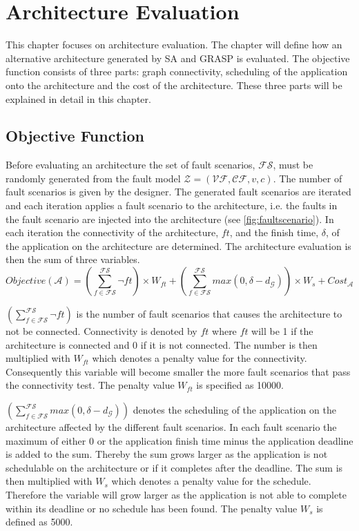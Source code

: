 \chapter{Architecture Evaluation}
\label{chap:arch-eval}
This chapter focuses on architecture evaluation. The chapter will define how an alternative architecture generated by SA and GRASP is evaluated. The objective function consists of three parts: graph connectivity, scheduling of the application onto the architecture and the cost of the architecture. These three parts will be explained in detail in this chapter.

\section{Objective Function}
Before evaluating an architecture the set of fault scenarios, $\mathcal{FS}$, must be randomly generated from the fault model $\mathcal{Z} = (\mathcal{VF}, \mathcal{CF}, v, c)$. The number of fault scenarios is given by the designer. The generated fault scenarios are iterated and each iteration applies a fault scenario to the architecture, i.e. the faults in the fault scenario are injected into the architecture (see \autoref{fig:faultscenario}). In each iteration the connectivity of the architecture, $ft$, and the finish time, $\delta$, of the application on the architecture are determined. The architecture evaluation is then the sum of three variables.
$$Objective(\mathcal{A}) = \left(\displaystyle\sum_{f \in \mathcal{FS}}^{\mathcal{FS}}{\neg ft}\right) \times W_{ft} + \left(\displaystyle\sum_{f \in \mathcal{FS}}^{\mathcal{FS}}{max(0, \delta - d_{\mathcal{G}})}\right) \times W_{s} + Cost_{\mathcal{A}}$$

$\left(\displaystyle\sum_{f \in \mathcal{FS}}^{\mathcal{FS}}{\neg ft}\right)$ is the number of fault scenarios that causes the architecture to not be connected. Connectivity is denoted by $ft$ where $ft$ will be 1 if the architecture is connected and 0 if it is not connected. The number is then multiplied with $W_{ft}$ which denotes a penalty value for the connectivity. Consequently this variable will become smaller the more fault scenarios that pass the connectivity test. The penalty value $W_{ft}$ is specified as 10000.

$\left(\displaystyle\sum_{f \in \mathcal{FS}}^{\mathcal{FS}}{max(0, \delta - d_{\mathcal{G}})}\right)$ denotes the scheduling of the application on the architecture affected by the different fault scenarios. In each fault scenario the maximum of either 0 or the application finish time minus the application deadline is added to the sum. Thereby the sum grows larger as the application is not schedulable on the architecture or if it completes after the deadline. The sum is then multiplied with $W_s$ which denotes a penalty value for the schedule. Therefore the variable will grow larger as the application is not able to complete within its deadline or no schedule has been found. The penalty value $W_s$ is defined as 5000.

